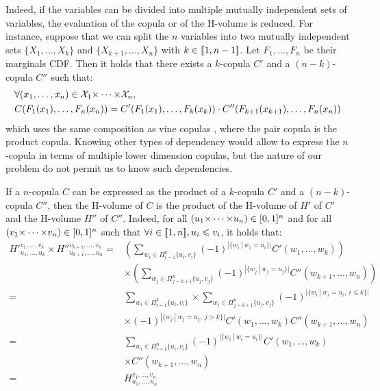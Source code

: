 Indeed, if the variables can be divided into multiple mutually independent sets of variables, the evaluation of the copula or of the H-volume is reduced. For instance, suppose that we can split the $n$ variables into two mutually independent sets $\{X_1,\dots,X_k\}$ and $\{X_{k+1},\dots,X_n\}$ with $k\in{[\![}1,n-1{]\!]}$. Let $F_1,\dots, F_n$ be their marginals CDF. Then it holds that there exists a $k$-copula $C'$ and a $(n-k)$-copula $C''$ such that:
\begin{align*}
    &\forall (x_1,\dots,x_n)\in{\mathcal{X}}_1{\times\dots\times}{\mathcal{X}}_n,\\
    &C(F_1(x_1),\dots,F_n(x_n))=C'(F_1(x_1),\dots, F_k(x_k))\cdot C''(F_{k+1}(x_{k+1}),\dots,F_n(x_n))
\end{align*}
which uses the same composition as vine copulas \cite{czado_vine_2022}, where the pair copula is the product copula. Knowing other types of dependency would allow to express the $n$-copula in terms of multiple lower dimension copulas, but the nature of our problem do not permit us to know such dependencies. 

\begin{remark}
    If a $n$-copula $C$ can be expressed as the product of a $k$-copula $C'$ and a $(n-k)$-copula $C''$, then the H-volume of $C$ is the product of the H-volume of $H'$ of $C'$ and the H-volume $H''$ of $C''$. Indeed, for all $(u_1{\times\dots\times} u_n)\in[0,1]^n$ and for all $(v_1{\times\dots\times} v_n)\in[0,1]^n$ such that $\forall i\in{[\![}1,n{]\!]}, u_i\leqslant v_i$, it holds that:
    \begin{align*}
        {H'}_{u_1,\dots, u_k}^{v_1,\dots, v_k}\times {H''}_{u_{k+1},\dots, u_n}^{v_{k+1},\dots, v_n} =& \left(\sum_{w_i\in\Pi_{i=1}^{k}\{u_i,v_i\}}(-1)^{|\{w_i~|~w_i=u_i\}|}C'(w_1,\dots,w_k)\right)\\
        &\times\left(\sum_{w_j\in\Pi_{j=k+1}^{n}\{u_j,v_j\}}(-1)^{|\{w_j~|~w_j=u_j\}|}C''(w_{k+1},\dots,w_n)\right)\\
        =& \sum_{w_i\in\Pi_{i=1}^{k}\{u_i,v_i\}}\times\sum_{w_j\in\Pi_{j=k+1}^{n}\{u_j,v_j\}}(-1)^{|\{w_i~|~w_i=u_i,~i\leqslant k\}|}\\
        &\times(-1)^{|\{w_j~|~w_j=u_j,~ j>k\}|}C'(w_1,\dots,w_k)C''(w_{k+1},\dots,w_n)\\
        =&\sum_{w_i\in\Pi_{i=1}^{n}\{u_i,v_i\}}(-1)^{|\{w_i~|~w_i=u_i\}|}C'(w_1,\dots,w_k)\\
        &\times C''(w_{k+1},\dots,w_n)\\
        =&H_{u_1,\dots, u_n}^{v_1,\dots, v_n}
    \end{align*}
\end{remark}


